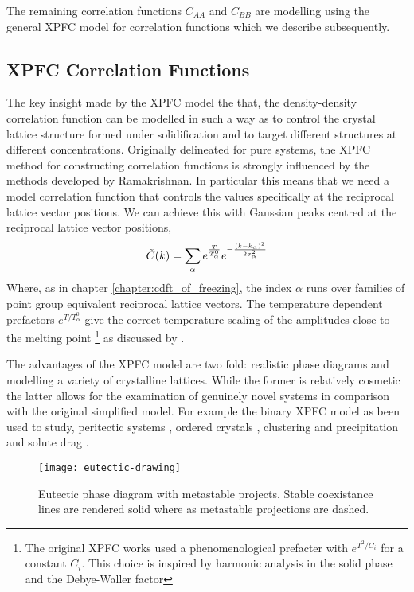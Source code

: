 The remaining correlation functions $C_{AA}$ and $C_{BB}$ are modelling
using the general XPFC model for correlation functions which we describe
subsequently.

\subsection{XPFC Correlation Functions} %

The key insight made by the XPFC model the that, the density-density
correlation function can be modelled in such a way as to control the crystal
lattice structure formed under solidification and to target different structures at
different concentrations.  Originally delineated for pure systems, the XPFC
method for constructing correlation functions is strongly influenced by the
methods developed by Ramakrishnan. In particular this means that we need a
model correlation function that controls the values specifically at the
reciprocal lattice vector positions. We can achieve this with Gaussian peaks
centred at the reciprocal lattice vector positions,
%
\begin{equation}
    \tilde{C}(k) = \sum_{\alpha} e^{\frac{T}{T_\alpha^0}}
        e^{ - \frac{(k - k_\alpha)^2}{2\sigma_\alpha^2}}
\end{equation}
%
Where, as in chapter \ref{chapter:cdft_of_freezing}, the index $\alpha$ runs
over families of point group equivalent reciprocal lattice vectors. The
temperature dependent prefactors $e^{T / T_\alpha^0}$ give the correct temperature
scaling of the amplitudes close to the melting point \footnote{The original
XPFC works used a phenomenological prefacter with $e^{T^2 / C_i}$ for a
constant $C_i$. This choice is inspired by harmonic analysis in the solid phase
and the Debye-Waller factor} as discussed by \cite{ALSTER17}.

The advantages of the XPFC model are two fold: realistic phase diagrams and
modelling a variety of crystalline lattices. While the former is relatively
cosmetic the latter allows for the examination of genuinely novel systems in
comparison with the original simplified model. For example the binary XPFC
model as been used to study, peritectic systems \cite{GREENWOOD11_BINARY}, 
ordered crystals \cite{ALSTER17}, clustering and precipitation 
\cite{FALLAH12, FALLAH13} and solute drag \cite{GREENWOOD12}.

\begin{figure}
    \centering
    \texttt{[image: eutectic-drawing]}
    \caption[Eutectic Phase Diagram with Metastable Projections]{
        \label{fig:eutectic_drawing} Eutectic phase diagram with metastable
        projects. Stable coexistance lines are rendered solid where as 
        metastable projections are dashed.
    }
\end{figure}

